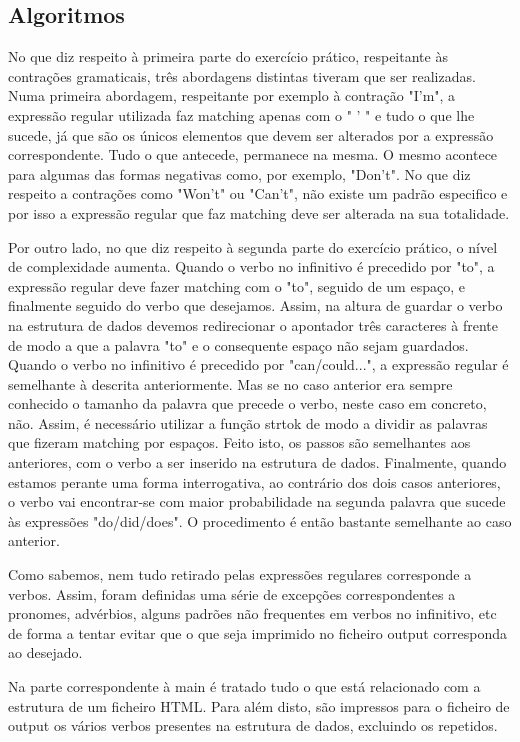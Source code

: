 \documentclass{report}
\begin{document}
\subsection{Algoritmos}
No que diz respeito à primeira parte do exercício prático, respeitante 
às contrações gramaticais, três abordagens distintas tiveram que ser realizadas. 
Numa primeira abordagem, respeitante por exemplo à contração "I'm", a 
expressão regular utilizada faz matching apenas com o " ' " e tudo o que lhe sucede, 
já que são os únicos elementos que devem ser alterados por a expressão correspondente. 
Tudo o que antecede, permanece na mesma. O mesmo acontece para algumas das 
formas negativas como, por exemplo, "Don't". No que diz respeito a contrações como 
"Won't" ou "Can't", não existe um padrão especifico e por isso a expressão regular 
que faz matching deve ser alterada na sua totalidade.

Por outro lado, no que diz respeito à segunda parte do exercício prático, o 
nível de complexidade aumenta. Quando o verbo no infinitivo é 
precedido por "to", a expressão regular deve fazer matching com o  "to", 
seguido de um espaço, e finalmente seguido do verbo que desejamos. 
Assim, na altura de guardar o verbo na estrutura de dados devemos redirecionar 
o apontador três caracteres à frente de modo a que a palavra "to" e o 
consequente espaço não sejam guardados. Quando o verbo no infinitivo é precedido 
por "can/could...", a expressão regular é semelhante à descrita anteriormente. 
Mas se no caso anterior era sempre conhecido o tamanho da palavra que 
precede o verbo, neste caso em concreto, não. Assim, é necessário utilizar 
a função strtok de modo a dividir as palavras que fizeram matching por espaços. 
Feito isto, os passos são semelhantes aos anteriores, com o verbo a ser inserido 
na estrutura de dados. Finalmente, quando estamos perante uma forma interrogativa, 
ao contrário dos dois casos anteriores, o verbo vai encontrar-se com maior 
probabilidade na segunda palavra que sucede às expressões "do/did/does". 
O procedimento é então bastante semelhante ao caso anterior. 

Como sabemos, nem tudo retirado pelas expressões regulares corresponde a verbos. 
Assim, foram definidas uma série de excepções correspondentes a pronomes, advérbios, 
alguns padrões não frequentes em verbos no infinitivo, etc de forma a tentar evitar 
que o que seja imprimido no ficheiro output corresponda ao desejado.

Na parte correspondente à main é tratado tudo o que está relacionado 
com a estrutura de um ficheiro HTML. Para além disto, são impressos para o 
ficheiro de output os vários verbos presentes na estrutura de dados, 
excluindo os repetidos.
\end{document}

